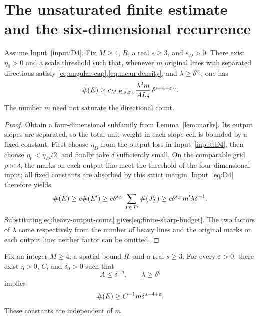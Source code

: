 \section{The unsaturated finite estimate and the six-dimensional recurrence}\label{sec:seeds}

\begin{proposition}\label{prop:finite}
Assume Input~\ref{input:D4}. Fix $M\ge4$, $R$, a real $s\ge3$, and $\varepsilon_D>0$.
There exist $\eta_0>0$ and a scale threshold such that, whenever $m$ original lines with separated directions satisfy
\eqref{eq:angular-cap},\eqref{eq:mean-density}, and $\lambda\ge\delta^{\eta_0}$, one has
\begin{equation}\label{eq:finite-sharp-budget}
 \#\!\left(E\right)\ge
 c_{M,R,s,\varepsilon_D}
 \frac{\lambda^2m}{AL_\delta}\,
 \delta^{s-4+\varepsilon_D}.
\end{equation}
The number $m$ need not saturate the directional count.
\end{proposition}

\begin{proof}
Obtain a four-dimensional subfamily from Lemma~\ref{lem:marks}.
Its output slopes are separated, so the total unit weight in each slope cell is bounded by a fixed constant.
First choose $\eta_D$ from the output loss in Input~\ref{input:D4}, then choose
$\eta_0<\eta_D/2$, and finally take $\delta$ sufficiently small.
On the comparable grid $\rho\asymp\delta$, the marks on each output line meet the threshold of the four-dimensional input;
all fixed constants are absorbed by this strict margin.
Input~\eqref{eq:D4} therefore yields
\[
 \#\!\left(E\right)\ge c\#\!\left(E'\right)
 \ge c\delta^{\varepsilon_D}\sum_{T\in\mathcal T'}\#\!\left(J'_T\right)
 \ge c\delta^{\varepsilon_D}m'\lambda\delta^{-1}.
\]
Substituting\eqref{eq:heavy-output-count} gives\eqref{eq:finite-sharp-budget}.
The two factors of $\lambda$ come respectively from the number of heavy lines and the original marks on each output line;
neither factor can be omitted.
\end{proof}

\begin{corollary}\label{cor:uniform}
Fix an integer $M\ge4$, a spatial bound $R$, and a real $s\ge3$. For every $\varepsilon>0$,
there exist $\eta>0$, $C$, and $\delta_0>0$ such that
\begin{equation}\label{eq:tolerance-assumptions}
 A\le\delta^{-\eta},\qquad \lambda\ge\delta^\eta
\end{equation}
implies
\begin{equation}\label{eq:unsaturated-finite}
 \#\!\left(E\right)\ge C^{-1}m\delta^{s-4+\varepsilon}.
\end{equation}
These constants are independent of $m$.
\end{corollary}

